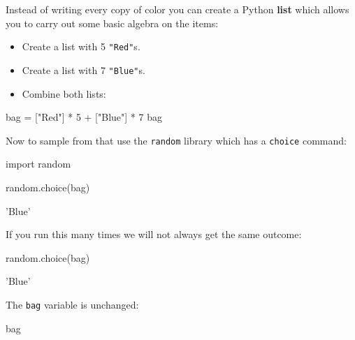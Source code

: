 Instead of writing every copy of color you can create a Python \textbf{list} which allows
you to carry out some basic algebra on the items:
\begin{itemize}
\item 

Create a list with 5 \texttt{"Red"}s.

\item 

Create a list with 7 \texttt{"Blue"}s.

\item 

Combine both lists:

\end{itemize}




\begin{pyin}
bag = ["Red"] * 5 + ["Blue"] * 7
bag
\end{pyin}





\begin{raw}
\end{raw}

Now to sample from that use the \texttt{random} library which has a \texttt{choice}
command:

\begin{pyin}
import random

random.choice(bag)
\end{pyin}





\begin{raw}
'Blue'
\end{raw}

If you run this many times we will not always get the same outcome:

\begin{pyin}
random.choice(bag)
\end{pyin}





\begin{pyin}
'Blue'
\end{pyin}

The \texttt{bag} variable is unchanged:

\begin{pyin}
bag
\end{pyin}

